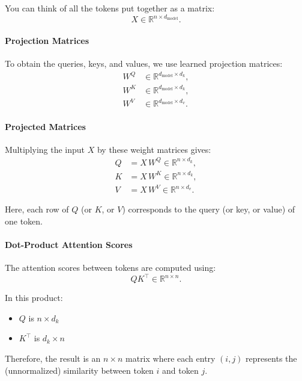   You can think of all the tokens put together as a matrix:
   \[
   X \in \mathbb{R}^{n \times d_{\text{model}}}.
   \]

\paragraph{Projection Matrices}

   To obtain the queries, keys, and values, we use learned projection matrices:
   \[
   \begin{aligned}
   W^Q &\in \mathbb{R}^{d_{\text{model}} \times d_k}, \\
   W^K &\in \mathbb{R}^{d_{\text{model}} \times d_k}, \\
   W^V &\in \mathbb{R}^{d_{\text{model}} \times d_v}.
   \end{aligned}
   \]

\paragraph{Projected Matrices}
   Multiplying the input \( X \) by these weight matrices gives:
   \[
   \begin{aligned}
   Q &= X\,W^Q \in \mathbb{R}^{n \times d_k}, \\
   K &= X\,W^K \in \mathbb{R}^{n \times d_k}, \\
   V &= X\,W^V \in \mathbb{R}^{n \times d_v}.
   \end{aligned}
   \]
   
   Here, each row of \( Q \) (or \( K \), or \( V \)) corresponds to the query (or key, or value) of one token.

\paragraph{Dot-Product Attention Scores}

   The attention scores between tokens are computed using:
   \[
   QK^\top \in \mathbb{R}^{n \times n}.
   \]
   
   In this product:
   \begin{itemize}
	   \item \( Q \) is \( n \times d_k \)
	   \item \( K^\top \) is \( d_k \times n \)
   \end{itemize}
   
   
   Therefore, the result is an \( n \times n \) matrix where each entry \((i,j)\) represents the (unnormalized) similarity between token \( i \) and token \( j \).

